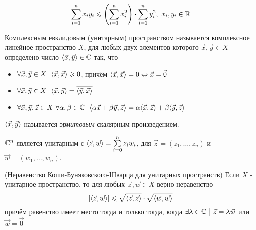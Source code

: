 \begin{corollary}
	\[
		\sum\limits_{i = 1}^n x_i y_i \leqslant \left(\sum\limits_{i = 1}^n x_i^2\right) \cdot \sum\limits_{i = 1}^n y_i^2,\ x_i, y_i \in \mathbb{R}
	\]
\end{corollary}

\begin{definition}
	Комплексным евклидовым (унитарным) пространством называется комплексное линейное пространство $X$, для любых двух элементов которого $\vec{x}, \vec{y} \in X$ определено число $\langle\vec{x}, \vec{y}\rangle \in \mathbb{C}$ так, что
	\begin{itemize}
		\item $\forall \vec{x}, \vec{y} \in X\ \ \trbr{\vec{x}, \vec{x}} \ge 0$, причём $\langle\vec{x}, \vec{x}\rangle = 0 \Leftrightarrow \vec{x} = \vec{0}$
		
		\item $\forall \vec{x}, \vec{y} \in X\ \ \trbr{\vec{x}, \vec{y}} = \overline{\trbr{\vec{y}, \vec{x}}}$
		
		\item $\forall \vec{x}, \vec{y}, \vec{z} \in X\ \forall \alpha, \beta \in \mathbb{C}\ \ \langle\alpha\vec{x} + \beta\vec{y}, \vec{z}\rangle = \alpha\langle\vec{x}, \vec{z}\rangle + \beta\langle\vec{y}, \vec{z}\rangle$
	\end{itemize}
	$\langle\vec{x}, \vec{y}\rangle$ называется \textit{эрмитовым} скалярным произведением.
\end{definition}

\begin{lemma}
	$\mathbb{C}^n$ является унитарным с $\langle\vec{z}, \vec{w}\rangle = \sum\limits_{i = 0}^n z_i \bar{w_i}$, для $\vec{z} = (z_1, \ldots, z_n)$ и $\vec{w} = (w_1, \ldots, w_n)$.
\end{lemma}

\begin{theorem} (Неравенство Коши-Буняковского-Шварца для унитарных пространств)
	Если $X$ - унитарное пространство, то для любых $\vec{z}, \vec{w} \in X$ верно неравенство
	\[
		|\langle\vec{z}, \vec{w}\rangle| \leqslant \sqrt{\langle\vec{z}, \vec{z}\rangle} \cdot \sqrt{\langle\vec{w}, \vec{w}\rangle}
	\]
	причём равенство имеет место тогда и только тогда, когда $\exists \lambda \in \mathbb{C} \ \big|\  \vec{z} = \lambda\vec{w}$ или $\vec{w} = \vec{0}$
\end{theorem}

